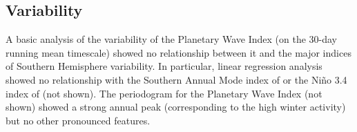 \subsection{Variability}

A basic analysis of the variability of the Planetary Wave Index (on the 30-day running mean timescale) showed no relationship between it and the major indices of Southern Hemisphere variability. In particular, linear regression analysis showed no relationship with the Southern Annual Mode index of \citet{Marshall2003} or the Ni\~{n}o 3.4 index of \citet{Trenberth2001} (not shown). The periodogram for the Planetary Wave Index (not shown) showed a strong annual peak (corresponding to the high winter activity) but no other pronounced features.